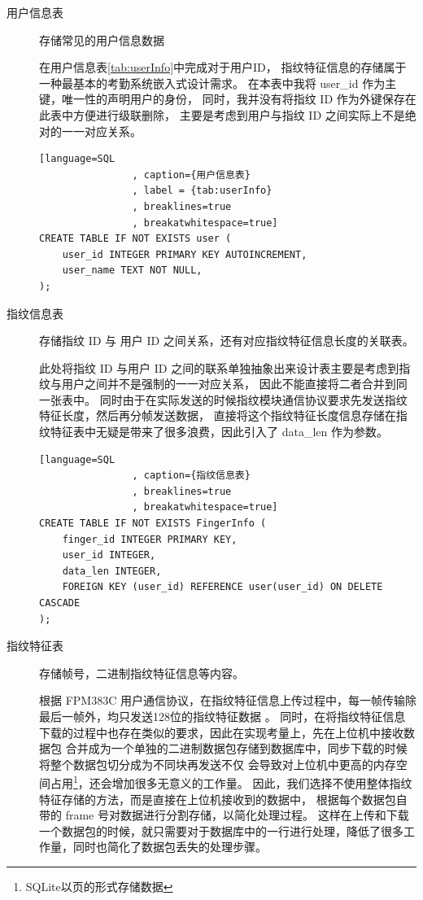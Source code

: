     \begin{description}
        \item[用户信息表] 存储常见的用户信息数据

            在用户信息表\ref{tab:userInfo}中完成对于用户ID，
            指纹特征信息的存储属于一种最基本的考勤系统嵌入式设计需求。
            在本表中我将 user\_id 作为主键，唯一性的声明用户的身份，
            同时，我并没有将指纹 ID 作为外键保存在此表中方便进行级联删除，
            主要是考虑到用户与指纹 ID 之间实际上不是绝对的一一对应关系。

            \begin{lstlisting}[language=SQL
                , caption={用户信息表}
                , label = {tab:userInfo}
                , breaklines=true
                , breakatwhitespace=true]
CREATE TABLE IF NOT EXISTS user (
    user_id INTEGER PRIMARY KEY AUTOINCREMENT,
    user_name TEXT NOT NULL,
);
            \end{lstlisting}
        
        \item[指纹信息表] 存储指纹 ID 与 用户 ID 之间关系，还有对应指纹特征信息长度的关联表。
        
            此处将指纹 ID 与用户 ID 之间的联系单独抽象出来设计表主要是考虑到指纹与用户之间并不是强制的一一对应关系，
            因此不能直接将二者合并到同一张表中。
            同时由于在实际发送的时候指纹模块通信协议要求先发送指纹特征长度，然后再分帧发送数据，
            直接将这个指纹特征长度信息存储在指纹特征表中无疑是带来了很多浪费，因此引入了 data\_len 作为参数。

            \begin{lstlisting}[language=SQL
                , caption={指纹信息表}
                , breaklines=true
                , breakatwhitespace=true]
CREATE TABLE IF NOT EXISTS FingerInfo (
    finger_id INTEGER PRIMARY KEY,
    user_id INTEGER,
    data_len INTEGER,
    FOREIGN KEY (user_id) REFERENCE user(user_id) ON DELETE CASCADE
);
            \end{lstlisting}          

        \item[指纹特征表] 存储帧号，二进制指纹特征信息等内容。
        
            根据 FPM383C 用户通信协议，在指纹特征信息上传过程中，每一帧传输除最后一帧外，均只发送128位的指纹特征数据
            \cite{fpm383c-modular-communication-protocol}。
            同时，在将指纹特征信息下载的过程中也存在类似的要求，因此在实现考量上，先在上位机中接收数据包
            合并成为一个单独的二进制数据包存储到数据库中，同步下载的时候将整个数据包切分成为不同块再发送不仅
            会导致对上位机中更高的内存空间占用\footnote{SQLite以页的形式存储数据}，还会增加很多无意义的工作量。
            因此，我们选择不使用整体指纹特征存储的方法，而是直接在上位机接收到的数据中，
            根据每个数据包自带的 frame 号对数据进行分割存储，以简化处理过程。
            这样在上传和下载一个数据包的时候，就只需要对于数据库中的一行进行处理，降低了很多工作量，同时也简化了数据包丢失的处理步骤。


\end{description}
